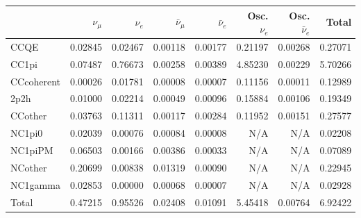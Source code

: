 \begin{tabular} { | l ||r | r | r | r | r | r | | r | }
\hline
              & $\nu_\mu$            & $\nu_e$              & $\bar{\nu}_{\mu}$    & $\bar{\nu}_{e}$      & Osc. $\nu_e$         & Osc. $\bar{\nu}_{e}$ & Total                \\ \hline\hline
 CCQE         & 0.02845              & 0.02467              & 0.00118              & 0.00177              & 0.21197              & 0.00268              & 0.27071              \\ \hline
 CC1pi        & 0.07487              & 0.76673              & 0.00258              & 0.00389              & 4.85230              & 0.00229              & 5.70266              \\ \hline
 CCcoherent   & 0.00026              & 0.01781              & 0.00008              & 0.00007              & 0.11156              & 0.00011              & 0.12989              \\ \hline
 2p2h         & 0.01000              & 0.02214              & 0.00049              & 0.00096              & 0.15884              & 0.00106              & 0.19349              \\ \hline
 CCother      & 0.03763              & 0.11311              & 0.00117              & 0.00284              & 0.11952              & 0.00151              & 0.27577              \\ \hline
 NC1pi0       & 0.02039              & 0.00076              & 0.00084              & 0.00008              & N/A                  & N/A                  & 0.02208              \\ \hline
 NC1piPM      & 0.06503              & 0.00166              & 0.00386              & 0.00033              & N/A                  & N/A                  & 0.07089              \\ \hline
 NCother      & 0.20699              & 0.00838              & 0.01319              & 0.00090              & N/A                  & N/A                  & 0.22945              \\ \hline
 NC1gamma     & 0.02853              & 0.00000              & 0.00068              & 0.00007              & N/A                  & N/A                  & 0.02928              \\ \hline
\hline
 Total        & 0.47215              & 0.95526              & 0.02408              & 0.01091              & 5.45418              & 0.00764              & 6.92422              \\ \hline

\end{tabular}
